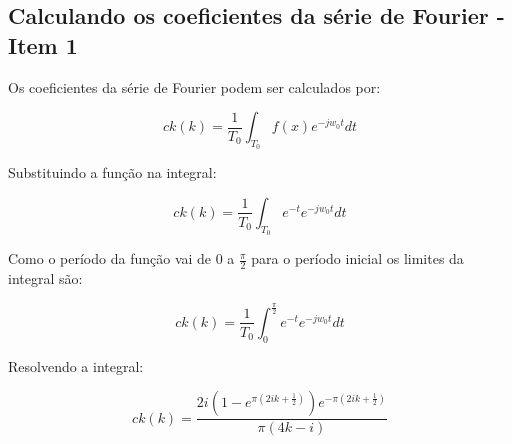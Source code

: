 \documentclass{article}
\begin{document}
    \hypertarget{calculando-os-coeficientes-da-suxe9rie-de-fourier---item-1}{%
\subsection{Calculando os coeficientes da série de Fourier - Item
1}\label{calculando-os-coeficientes-da-suxe9rie-de-fourier---item-1}}

Os coeficientes da série de Fourier podem ser calculados por:

\[ck(k) = \frac{1}{T_0} \int_{T_0} f(x)e^{-j w_0 t}dt\]

Substituindo a função na integral:

\[ck(k) = \frac{1}{T_0} \int_{T_0} e^{-t} e^{-j w_0 t}dt\]

Como o período da função vai de 0 a \(\frac{\pi}{2}\) para o período
inicial os limites da integral são:

\[ck(k) = \frac{1}{T_0} \int_{0}^{\frac{\pi}{2}} e^{-t} e^{-j w_0 t}dt\]

Resolvendo a integral:

\[ck(k) = \frac{2 i \left(1 - e^{\pi \left(2 i k + \frac{1}{2}\right)}\right) e^{- \pi \left(2 i k + \frac{1}{2}\right)}}{\pi \left(4 k - i\right)}\]
\end{document}
